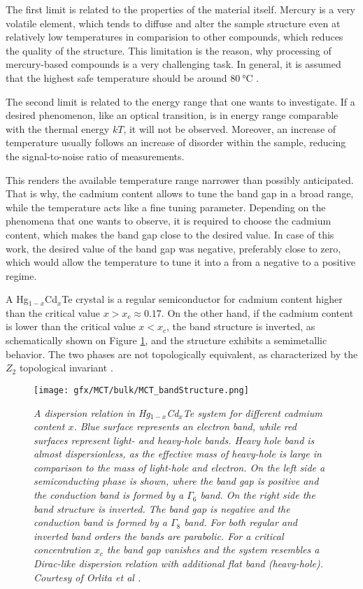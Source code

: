 \documentclass[titlepage,a4paper]{book}
\begin{document}
The first limit is related to the properties of the material itself. Mercury is a very volatile element, which tends to diffuse and alter the sample structure even at relatively low temperatures in comparision to other compounds, which reduces the quality of the structure. This limitation is the reason, why processing of mercury-based compounds is a very challenging task. In general, it is assumed that the highest safe temperature should be around $\SI{80}{\degreeCelsius}$ \cite{Daumer_MCT_temperature}.

The second limit is related to the energy range that one wants to investigate. If a desired phenomenon, like an optical transition, is in energy range comparable with the thermal energy $kT$, it will not be observed. Moreover, an increase of temperature usually follows an increase of disorder within the sample, reducing the signal-to-noise ratio of measurements.

This renders the available temperature range narrower than possibly anticipated. That is why, the cadmium content allows to tune the band gap in a broad range, while the temperature acts like a fine tuning parameter. Depending on the phenomena that one wants to observe, it is required to choose the cadmium content, which makes the band gap close to the desired value. In case of this work, the desired value of the band gap was negative, preferably close to zero, which would allow the temperature to tune it into a from a negative to a positive regime. 

A Hg$_{1-x}$Cd$_x$Te crystal is a regular semiconductor for cadmium content higher than the critical value $x > x_c \approx 0.17$. On the other hand, if the cadmium content is lower than the critical value $x < x_c$, the band structure is inverted, as schematically shown on Figure \ref{fig:MCT_bandStructure}, and the structure exhibits a semimetallic behavior. The two phases are not topologically equivalent, as characterized by the $Z_2$ topological invariant \cite{Bernevig_Topology2}.

\begin{figure}[ht]
	\centering
	\texttt{[image: gfx/MCT/bulk/MCT\_bandStructure.png]}
	\vspace{-10pt}
	\caption{\textit{A dispersion relation in Hg$_{1-x}$Cd$_x$Te system for different cadmium content $x$. Blue surface represents an electron band, while red surfaces represent light- and heavy-hole bands. Heavy hole band is almost dispersionless, as the effective mass of heavy-hole is large in comparison to the mass of light-hole and electron. On the left side a semiconducting phase is shown, where the band gap is positive and the conduction band is formed by a $\Gamma_6$ band. On the right side the band structure is inverted. The band gap is negative and the conduction band is formed by a $\Gamma_8$ band. For both regular and inverted band orders the bands are parabolic. For a critical concentration $x_c$ the band gap vanishes and the system resembles a Dirac-like dispersion relation with additional flat band (heavy-hole). Courtesy of Orlita et al \cite{Orlita_MCT}.}}
	\label{fig:MCT_bandStructure}
\end{figure} 
\end{document}
